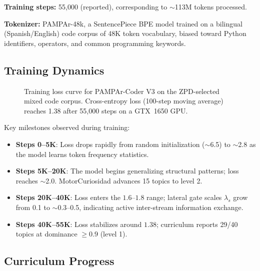 \documentclass[11pt,a4paper]{article}
\begin{document}
\textbf{Training steps:} 55,000 (reported), corresponding to $\sim$113M
tokens processed.

\textbf{Tokenizer:} PAMPAr-48k, a SentencePiece BPE model trained on a
bilingual (Spanish/English) code corpus of 48K token vocabulary, biased
toward Python identifiers, operators, and common programming keywords.

\subsection{Training Dynamics}

\begin{figure}[h]
\centering
\caption{Training loss curve for PAMPAr-Coder V3 on the ZPD-selected mixed
code corpus.  Cross-entropy loss (100-step moving average) reaches 1.38 after
55,000 steps on a GTX~1650 GPU.}
\label{fig:training_curve}
\end{figure}

Key milestones observed during training:

\begin{itemize}
    \item \textbf{Steps 0--5K}: Loss drops rapidly from random initialization
    ($\sim$6.5) to $\sim$2.8 as the model learns token frequency statistics.
    \item \textbf{Steps 5K--20K}: The model begins generalizing structural
    patterns; loss reaches $\sim$2.0.  MotorCuriosidad advances 15 topics to
    level 2.
    \item \textbf{Steps 20K--40K}: Loss enters the $1.6$--$1.8$ range;
    lateral gate scales $\lambda_s$ grow from 0.1 to $\sim$0.3--0.5,
    indicating active inter-stream information exchange.
    \item \textbf{Steps 40K--55K}: Loss stabilizes around $1.38$; curriculum
    reports 29/40 topics at dominance $\geq 0.9$ (level 1).
\end{itemize}

\subsection{Curriculum Progress}
\end{document}
